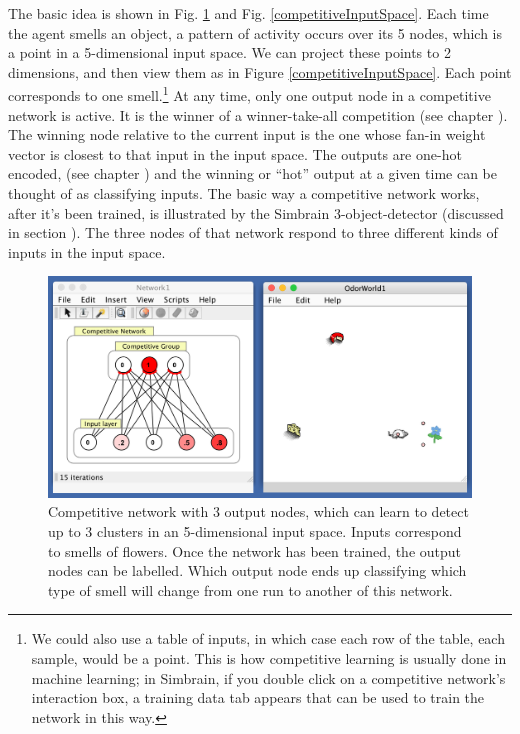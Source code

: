 The basic idea is shown in Fig. \ref{competitive_3} and Fig. \ref{competitiveInputSpace}. Each time the agent smells an object, a pattern of activity occurs over its 5 nodes, which is a point in a 5-dimensional input space. We can project these points to 2 dimensions, and then view them as in Figure \ref{competitiveInputSpace}. Each point corresponds to one smell.\footnote{We could also use a table of inputs, in which case each row of the table, each sample, would be a point. This is how competitive learning is usually done in machine learning; in Simbrain, if you double click on a competitive network's interaction box, a training data tab appears that can be used to train the network in this way.} At any time, only one output node in a competitive network is active. It is the winner of a winner-take-all competition (see chapter ). The winning node relative to the current input is the one whose fan-in weight vector is closest to that input in the input space. The outputs are one-hot encoded, (see chapter ) and the winning or ``hot'' output at a given time can be thought of as classifying inputs. The basic way a competitive network works, after it's been trained, is illustrated by the Simbrain 3-object-detector (discussed in section ). The three nodes of that network respond to three different kinds of inputs in the input space.

\begin{figure}[h]
\centering
\includegraphics[scale=.4]{./images/competitive_3.png}
\caption[Simbrain screenshot]{Competitive network with 3 output nodes, which can learn to detect up to 3 clusters in an 5-dimensional input space. Inputs correspond to smells of flowers. Once the network has been trained, the output nodes can be labelled. Which output node ends up classifying which type of smell will change from one run to another of this network.}
\label{competitive_3}
\end{figure}

